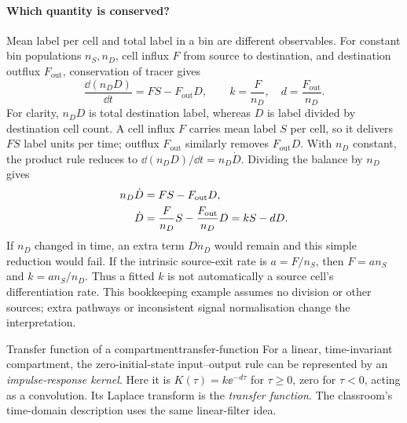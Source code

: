 \paragraph{Which quantity is conserved?}
Mean label per cell and total label in a bin are different observables. For constant bin populations $n_S,n_D$, cell influx $F$ from source to destination, and destination outflux $F_{\mathrm{out}}$, conservation of tracer gives
\begin{equation}\label{eq:lec02:normalisation}
\frac{\dd(n_DD)}{\dd t}=FS-F_{\mathrm{out}}D,
\qquad k=\frac{F}{n_D},\quad d=\frac{F_{\mathrm{out}}}{n_D}.
\end{equation}
For clarity, $n_DD$ is total destination label, whereas $D$ is label divided by destination cell count. A cell influx $F$ carries mean label $S$ per cell, so it delivers $FS$ label units per time; outflux $F_{\mathrm{out}}$ similarly removes $F_{\mathrm{out}}D$. With $n_D$ constant, the product rule reduces to $\dd(n_DD)/\dd t=n_D\dot D$. Dividing the balance by $n_D$ gives
\begin{align}
n_D\dot D&=FS-F_{\mathrm{out}}D,\notag\\
\dot D&=\frac{F}{n_D}S-\frac{F_{\mathrm{out}}}{n_D}D=kS-dD.\label{eq:lec02:per-cell-balance}
\end{align}
If $n_D$ changed in time, an extra term $D\dot n_D$ would remain and this simple reduction would fail. If the intrinsic source-exit rate is $a=F/n_S$, then $F=an_S$ and $k=a n_S/n_D$. Thus a fitted $k$ is not automatically a source cell's differentiation rate. This bookkeeping example assumes no division or other sources; extra pathways or inconsistent signal normalisation change the interpretation.

\begin{definition}{Transfer function of a compartment}{transfer-function}
For a linear, time-invariant compartment, the zero-initial-state input--output rule can be represented by an \emph{impulse-response kernel}. Here it is $K(\tau)=k\ee^{-d\tau}$ for $\tau\geq0$, zero for $\tau<0$, acting as a convolution. Its Laplace transform is the \emph{transfer function}. The classroom's time-domain description uses the same linear-filter idea.
\end{definition}

